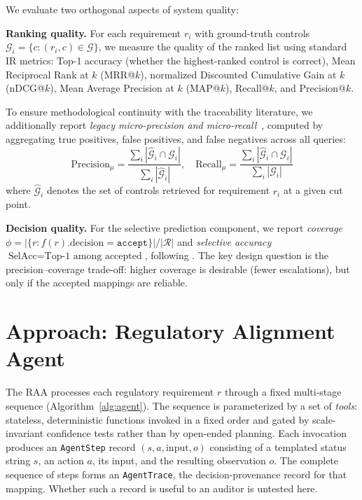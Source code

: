 \documentclass[smallextended,natbib]{svjour3}
\begin{document}
\label{sec:metrics}

We evaluate two orthogonal aspects of system quality:

\noindent\textbf{Ranking quality.}
For each requirement $r_i$ with ground-truth controls $\mathcal{G}_i = \{c : (r_i, c) \in \mathcal{G}\}$, we measure the quality of the ranked list using standard IR metrics: Top-1 accuracy (whether the highest-ranked control is correct), Mean Reciprocal Rank at $k$ (MRR@$k$), normalized Discounted Cumulative Gain at $k$ (nDCG@$k$), Mean Average Precision at $k$ (MAP@$k$), Recall@$k$, and Precision@$k$.

To ensure methodological continuity with the traceability literature, we additionally report \emph{legacy micro-precision and micro-recall}~\citep{MarcusMaletic2003}, computed by aggregating true positives, false positives, and false negatives across all queries:
\begin{equation}
\text{Precision}_\mu = \frac{\sum_i |\hat{\mathcal{G}}_i \cap \mathcal{G}_i|}{\sum_i |\hat{\mathcal{G}}_i|}, \quad
\text{Recall}_\mu = \frac{\sum_i |\hat{\mathcal{G}}_i \cap \mathcal{G}_i|}{\sum_i |\mathcal{G}_i|}
\end{equation}
where $\hat{\mathcal{G}}_i$ denotes the set of controls retrieved for requirement $r_i$ at a given cut point.

\noindent\textbf{Decision quality.}
For the selective prediction component, we report \emph{coverage} $\phi = |\{r : f(r).\text{decision} = \texttt{accept}\}| / |\mathcal{R}|$ and \emph{selective accuracy} $\text{SelAcc} = \text{Top-1 among accepted}$, following \citet{Geifman2017}.
The key design question is the precision--coverage trade-off: higher coverage is desirable (fewer escalations), but only if the accepted mappings are reliable.


\section{Approach: Regulatory Alignment Agent}
\label{sec:architecture}


The RAA processes each regulatory requirement $r$ through a fixed multi-stage sequence (Algorithm~\ref{alg:agent}).
The sequence is parameterized by a set of \emph{tools}: stateless, deterministic functions invoked in a fixed order and gated by scale-invariant confidence tests rather than by open-ended planning.
Each invocation produces an \texttt{AgentStep} record $(s, a, \text{input}, o)$ consisting of a templated status string $s$, an action $a$, its input, and the resulting observation $o$.
The complete sequence of steps forms an \texttt{AgentTrace}, the decision-provenance record for that mapping. Whether such a record is useful to an auditor is untested here.
\end{document}
